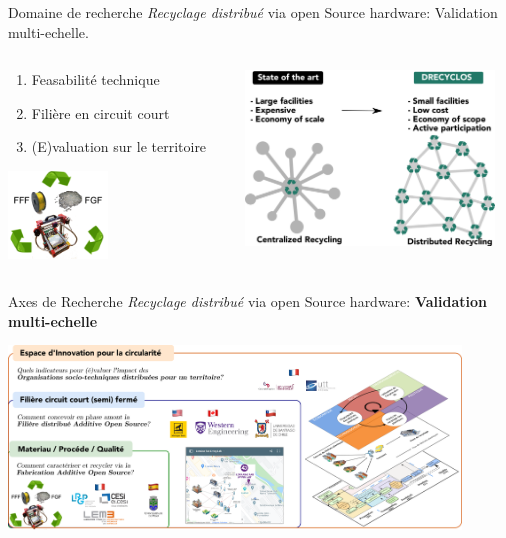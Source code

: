 \documentclass[
  11pt,
  ignorenonframetext,
  aspectratio=169,
  c]{beamer}
\providecommand{\tightlist}{%
  \setlength{\itemsep}{0pt}\setlength{\parskip}{0pt}}\usepackage{longtable,booktabs,array}
\begin{document}
\begin{frame}[t]{Domaine de recherche}
\protect\hypertarget{domaine-de-recherche}{}
\emph{Recyclage distribué} via open Source hardware: Validation
multi-echelle.

\begin{columns}[T]
\begin{column}[c]{0.6\textwidth}
\begin{enumerate}
\tightlist
\item
  Feasabilité technique
\item
  Filière en circuit court
\item
  (E)valuation sur le territoire
\end{enumerate}

\includegraphics[width=1.04167in,height=\textheight]{Figures/slides/Recherche-Intro-01.png}
\end{column}

\begin{column}[c]{0.4\textwidth}
\includegraphics[width=2.60417in,height=\textheight]{Figures/slides/Abstract.png}
\end{column}
\end{columns}

\note{}
\end{frame}

\begin{frame}[t]{Axes de Recherche}
\protect\hypertarget{axes-de-recherche}{}
\emph{Recyclage distribué} via open Source hardware: \textbf{Validation
multi-echelle}

\includegraphics[width=0.9\textwidth,height=\textheight]{Figures/slides/recherche-fabio.png}

\end{frame}
\end{document}
